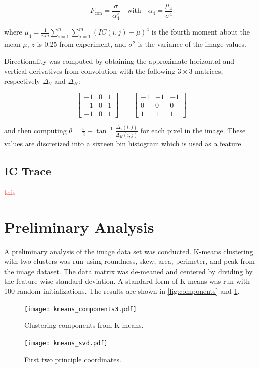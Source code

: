 \documentclass[11pt]{article}
\newcommand{\todo}[1]{\textcolor{red}{#1}}
\begin{document}
$$
F_\text{con} = \frac{\sigma}{\alpha_4^z} \quad \text{with} \quad \alpha_4 = \frac{\mu_4}{\sigma^4}
$$

\noindent
where $\mu_4 = \frac{1}{nm} \sum_{i=1}^n \sum_{j=1}^m (IC(i,j)-\mu)^4$
is the fourth moment about the mean $\mu$, $z$ is \num{0.25} from experiment, and $\sigma^2$ is the variance of the image values.

Directionality was computed by obtaining the approximate horizontal and vertical derivatives from convolution with the following $3\times3$ matrices, respectively $\Delta_V$ and $\Delta_H$:

$$
\begin{bmatrix}
-1 & 0 & 1 \\ -1 & 0 & 1 \\ -1 & 0 & 1
\end{bmatrix} \qquad
\begin{bmatrix}
-1 & -1 & -1 \\
0 & 0 & 0 \\
1 & 1 & 1
\end{bmatrix}
$$

\noindent
and then computing $\theta = \frac{\pi}{2} + \tan^{-1}\frac{\Delta_V(i,j)}{\Delta_H(i,j)}$ for each pixel in the image.
These values are discretized into a sixteen bin histogram which is used as a feature.

\subsection{IC Trace}

\todo{this}

\section{Preliminary Analysis}

A preliminary analysis of the image data set was conducted.
K-means clustering with two clusters was run using roundness, skew, area, perimeter, and peak from the image dataset. 
The data matrix was de-meaned and centered by dividing by the feature-wise standard deviation.
A standard form of K-means was run with \num{100} random initializations.
The results are shown in \cref{fig:components} and \cref{fig:principle}.

\begin{figure}[h]
    \centering
    \begin{minipage}{.75\textwidth}
      \centering
      \texttt{[image: kmeans\_components3.pdf]}
      \caption{\footnotesize Clustering components from K-means.}
      \label{fig:components}
    \end{minipage}%
    \begin{minipage}{.25\textwidth}
      \centering
      \texttt{[image: kmeans\_svd.pdf]}
      \caption{\footnotesize First two principle coordinates. }
      \label{fig:principle}
    \end{minipage}
\end{figure}
\end{document}
